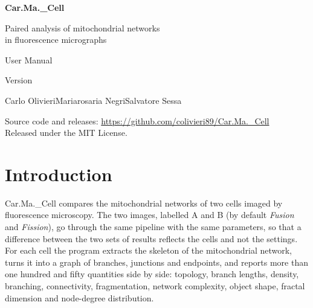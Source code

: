 \documentclass[fontsize=10.5pt,paper=a4,parskip=half,headings=normal,numbers=noenddot,
  open=any,captions=tableheading]{scrreprt}
\newcommand{\prog}{Car.Ma.\_Cell}
\begin{document}
\begin{titlepage}
\sffamily\color{ink}
\vspace*{3cm}
{\fontsize{40}{44}\selectfont\bfseries \prog\par}
\vspace{0.6cm}
{\Large Paired analysis of mitochondrial networks\\ in fluorescence micrographs\par}
\vspace{1.4cm}
{\LARGE User Manual\par}
\vspace{0.3cm}
{\large Version \CMCVersion\quad\textcolor{muted}{\textbullet}\quad \CMCDate\par}
\vfill
{\large Carlo Olivieri\quad Mariarosaria Negri\quad Salvatore Sessa\par}
\vspace{0.6cm}
{\small\color{muted}
Source code and releases: \url{https://github.com/colivieri89/Car.Ma._Cell}\\[2pt]
Released under the MIT License.\par}
\vspace{1cm}
\end{titlepage}

\tableofcontents

\chapter{Introduction}

\prog{} compares the mitochondrial networks of two cells imaged by fluorescence microscopy. The two images, labelled A and B (by default \emph{Fusion} and \emph{Fission}), go through the same pipeline with the same parameters, so that a difference between the two sets of results reflects the cells and not the settings. For each cell the program extracts the skeleton of the mitochondrial network, turns it into a graph of branches, junctions and endpoints, and reports more than one hundred and fifty quantities side by side: topology, branch lengths, density, branching, connectivity, fragmentation, network complexity, object shape, fractal dimension and node-degree distribution.
\end{document}
